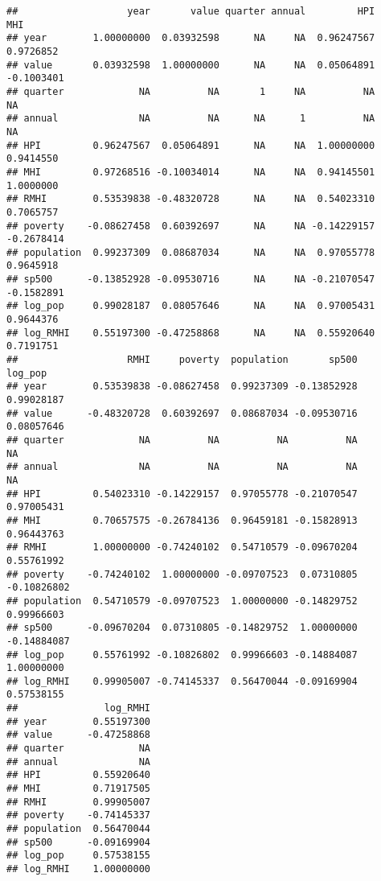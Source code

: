 \documentclass[
]{article}
\newenvironment{Shaded}{\begin{snugshade}}{\end{snugshade}}
\newcommand{\DataTypeTok}[1]{\textcolor[rgb]{0.13,0.29,0.53}{#1}}
\newcommand{\DecValTok}[1]{\textcolor[rgb]{0.00,0.00,0.81}{#1}}
\newcommand{\KeywordTok}[1]{\textcolor[rgb]{0.13,0.29,0.53}{\textbf{#1}}}
\newcommand{\NormalTok}[1]{#1}
\newcommand{\OperatorTok}[1]{\textcolor[rgb]{0.81,0.36,0.00}{\textbf{#1}}}
\newcommand{\StringTok}[1]{\textcolor[rgb]{0.31,0.60,0.02}{#1}}
\begin{document}
\begin{verbatim}
##                   year       value quarter annual         HPI        MHI
## year        1.00000000  0.03932598      NA     NA  0.96247567  0.9726852
## value       0.03932598  1.00000000      NA     NA  0.05064891 -0.1003401
## quarter             NA          NA       1     NA          NA         NA
## annual              NA          NA      NA      1          NA         NA
## HPI         0.96247567  0.05064891      NA     NA  1.00000000  0.9414550
## MHI         0.97268516 -0.10034014      NA     NA  0.94145501  1.0000000
## RMHI        0.53539838 -0.48320728      NA     NA  0.54023310  0.7065757
## poverty    -0.08627458  0.60392697      NA     NA -0.14229157 -0.2678414
## population  0.99237309  0.08687034      NA     NA  0.97055778  0.9645918
## sp500      -0.13852928 -0.09530716      NA     NA -0.21070547 -0.1582891
## log_pop     0.99028187  0.08057646      NA     NA  0.97005431  0.9644376
## log_RMHI    0.55197300 -0.47258868      NA     NA  0.55920640  0.7191751
##                   RMHI     poverty  population       sp500     log_pop
## year        0.53539838 -0.08627458  0.99237309 -0.13852928  0.99028187
## value      -0.48320728  0.60392697  0.08687034 -0.09530716  0.08057646
## quarter             NA          NA          NA          NA          NA
## annual              NA          NA          NA          NA          NA
## HPI         0.54023310 -0.14229157  0.97055778 -0.21070547  0.97005431
## MHI         0.70657575 -0.26784136  0.96459181 -0.15828913  0.96443763
## RMHI        1.00000000 -0.74240102  0.54710579 -0.09670204  0.55761992
## poverty    -0.74240102  1.00000000 -0.09707523  0.07310805 -0.10826802
## population  0.54710579 -0.09707523  1.00000000 -0.14829752  0.99966603
## sp500      -0.09670204  0.07310805 -0.14829752  1.00000000 -0.14884087
## log_pop     0.55761992 -0.10826802  0.99966603 -0.14884087  1.00000000
## log_RMHI    0.99905007 -0.74145337  0.56470044 -0.09169904  0.57538155
##               log_RMHI
## year        0.55197300
## value      -0.47258868
## quarter             NA
## annual              NA
## HPI         0.55920640
## MHI         0.71917505
## RMHI        0.99905007
## poverty    -0.74145337
## population  0.56470044
## sp500      -0.09169904
## log_pop     0.57538155
## log_RMHI    1.00000000
\end{verbatim}

\begin{Shaded}
\end{Shaded}
\end{document}
